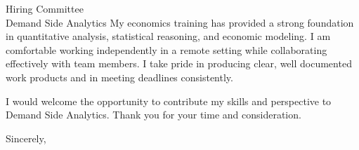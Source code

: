\documentclass[11pt]{letter}
\begin{document}
\begin{letter}{Hiring Committee \\ Demand Side Analytics}
My economics training has provided a strong foundation in quantitative analysis, statistical reasoning, and economic modeling. I am comfortable working independently in a remote setting while collaborating effectively with team members. I take pride in producing clear, well documented work products and in meeting deadlines consistently.

I would welcome the opportunity to contribute my skills and perspective to Demand Side Analytics. Thank you for your time and consideration.

\closing{Sincerely,}

\end{letter}
\end{document}
